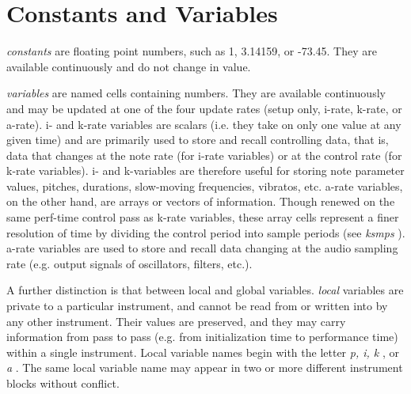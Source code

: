 \begin{comment}
\documentclass[10pt]{article}
\usepackage{fullpage, graphicx, url}
\setlength{\parskip}{1ex}
\setlength{\parindent}{0ex}
\title{Constants and Variables}



\begin{tabular}{ccc}
The Alternative Csound Reference Manual & & \\
Previous &Syntax of the Orchestra &Next

\end{tabular}

\end{comment}
\section{Constants and Variables}


 \emph{constants}
 are floating point numbers, such as 1, 3.14159, or -73.45. They are available continuously and do not change in value. 


 \emph{variables}
 are named cells containing numbers. They are available continuously and may be updated at one of the four update rates (setup only, i-rate, k-rate, or a-rate). i- and k-rate variables are scalars (i.e. they take on only one value at any given time) and are primarily used to store and recall controlling data, that is, data that changes at the note rate (for i-rate variables) or at the control rate (for k-rate variables). i- and k-variables are therefore useful for storing note parameter values, pitches, durations, slow-moving frequencies, vibratos, etc. a-rate variables, on the other hand, are arrays or vectors of information. Though renewed on the same perf-time control pass as k-rate variables, these array cells represent a finer resolution of time by dividing the control period into sample periods (see \emph{ksmps}
). a-rate variables are used to store and recall data changing at the audio sampling rate (e.g. output signals of oscillators, filters, etc.). 


  A further distinction is that between local and global variables. \emph{local}
 variables are private to a particular instrument, and cannot be read from or written into by any other instrument. Their values are preserved, and they may carry information from pass to pass (e.g. from initialization time to performance time) within a single instrument. Local variable names begin with the letter \emph{p, i, k}
, or \emph{a}
. The same local variable name may appear in two or more different instrument blocks without conflict. 


